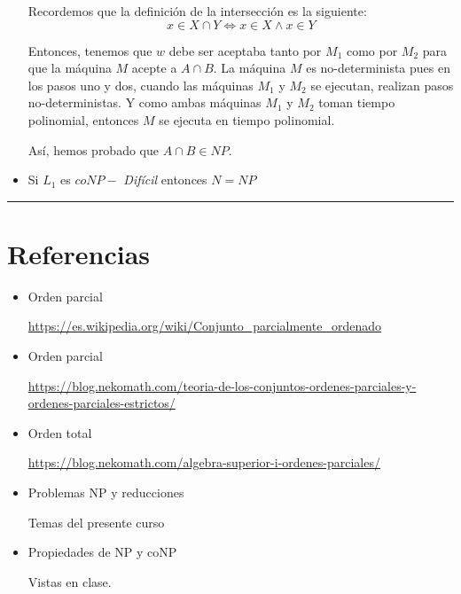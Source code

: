 \documentclass[12pt,letterpaper]{article}
\newcommand{\lineaxd}{{\color{brown}\rule{\linewidth}{0.5mm}}}
\begin{document}
\begin{itemize}
    Recordemos que la definición de la intersección es la siguiente:
    \begin{equation*}
        x \in X \cap Y \Leftrightarrow x \in X \land x \in Y
    \end{equation*}

    Entonces, tenemos que $w$ debe ser aceptaba tanto por $M_1$ como por 
    $M_2$ para que la máquina $M$ acepte a $A \cap B$. La máquina $M$ es 
    no-determinista pues en los pasos uno y dos, cuando las máquinas $M_1$ 
    y $M_2$ se ejecutan, realizan pasos no-deterministas. Y como ambas 
    máquinas $M_1$ y $M_2$ toman tiempo polinomial, entonces $M$ se ejecuta 
    en tiempo polinomial. 

    Así, hemos probado que $A \cap B \in NP$. 
    
    \item Si $L_1$ es $coNP -$ \textit{Difícil} entonces $N=NP$

\end{itemize}
\lineaxd
\newpage
\section*{Referencias}
\begin{itemize}
    \item Orden parcial
    
    \url{https://es.wikipedia.org/wiki/Conjunto_parcialmente_ordenado}
    
    \item Orden parcial
    
    \url{https://blog.nekomath.com/teoria-de-los-conjuntos-ordenes-parciales-y-ordenes-parciales-estrictos/}
    
    \item Orden total
    
    \url{https://blog.nekomath.com/algebra-superior-i-ordenes-parciales/}
    
    \item Problemas NP y reducciones
    
    Temas del presente curso
    
    \item Propiedades de NP y coNP
    
    Vistas en clase.
    
\end{itemize}
\end{document}
